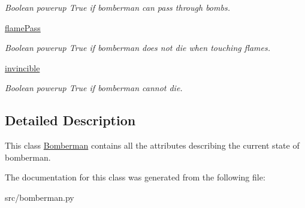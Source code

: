 \begin{DoxyCompactItemize}
\begin{DoxyCompactList}\small\item\em Boolean powerup True if bomberman can pass through bombs. \end{DoxyCompactList}\item 
\hypertarget{classsrc_1_1bomberman_1_1_bomberman_a04139259920ddb2447a762bcbc8a53c4}{}\hyperlink{classsrc_1_1bomberman_1_1_bomberman_a04139259920ddb2447a762bcbc8a53c4}{flame\+Pass}\label{classsrc_1_1bomberman_1_1_bomberman_a04139259920ddb2447a762bcbc8a53c4}

\begin{DoxyCompactList}\small\item\em Boolean powerup True if bomberman does not die when touching flames. \end{DoxyCompactList}\item 
\hypertarget{classsrc_1_1bomberman_1_1_bomberman_a6a139150d8425b6bf1a8431a991fc0f1}{}\hyperlink{classsrc_1_1bomberman_1_1_bomberman_a6a139150d8425b6bf1a8431a991fc0f1}{invincible}\label{classsrc_1_1bomberman_1_1_bomberman_a6a139150d8425b6bf1a8431a991fc0f1}

\begin{DoxyCompactList}\small\item\em Boolean powerup True if bomberman cannot die. \end{DoxyCompactList}\end{DoxyCompactItemize}


\subsection{Detailed Description}
This class \hyperlink{classsrc_1_1bomberman_1_1_bomberman}{Bomberman} contains all the attributes describing the current state of bomberman. 

The documentation for this class was generated from the following file\+:\begin{DoxyCompactItemize}
\item 
src/bomberman.\+py\end{DoxyCompactItemize}
